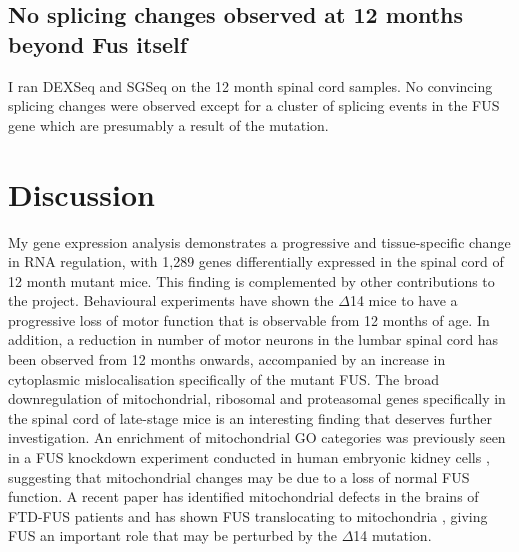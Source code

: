 \subsection{No splicing changes observed at 12 months beyond Fus itself}
I ran DEXSeq and SGSeq on the 12 month spinal cord samples. No convincing splicing changes were observed except for a cluster of splicing events in the FUS gene which are presumably a result of the mutation.


\section{Discussion}
My gene expression analysis demonstrates a progressive and tissue-specific change in RNA regulation, with 1,289 genes differentially expressed in the spinal cord of 12 month mutant mice. This finding is complemented by other contributions to the project. Behavioural experiments have shown the $\Delta$14 mice to have a progressive loss of motor function that is observable from 12 months of age. In addition, a reduction in number of motor neurons in the lumbar spinal cord has been observed from 12 months onwards, accompanied by an increase in cytoplasmic mislocalisation specifically of the mutant FUS.
The broad downregulation of mitochondrial, ribosomal and proteasomal genes specifically in the spinal cord of late-stage mice is an interesting finding that deserves further investigation. An enrichment of mitochondrial GO categories was previously seen in a FUS knockdown experiment conducted in human embryonic kidney cells  \citep{Schwartz2012}, suggesting that mitochondrial changes may be due to a loss of normal FUS function. A recent paper has identified mitochondrial defects in the brains of FTD-FUS patients and has shown FUS translocating to mitochondria \citep{Deng2015}, giving FUS an important role that may be perturbed by the $\Delta$14 mutation.
